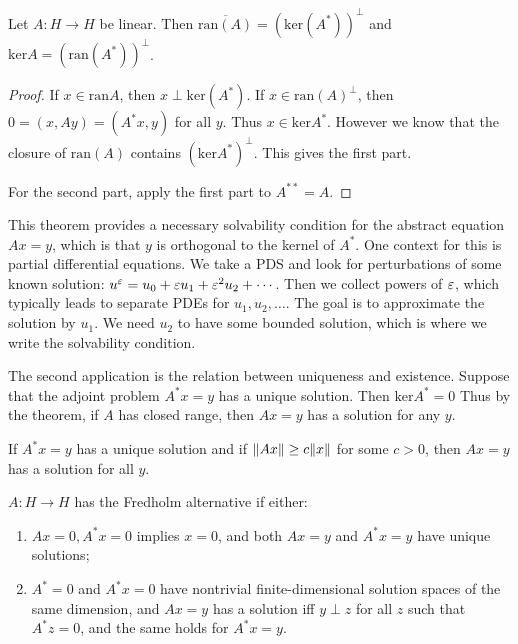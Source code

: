 \documentclass[10pt, twoside]{article}
\begin{document}
    \begin{thm} Let $A: H \to H$ be linear. Then $\overline{\mathrm{ran}(A)} =
        (\mathrm{ker}(A^*))^{\perp}$ and $\mathrm{ker} A =
        (\mathrm{ran}(A^*))^{\perp}$.

        \begin{proof} If $x \in \mathrm{ran} A$, then $x \perp
            \mathrm{ker}(A^*)$. If $x \in \mathrm{ran}(A)^{\perp}$, then $0 =
            (x,Ay) = (A^*x,y)$ for all $y$. Thus $x \in \mathrm{ker}A^*$.
            However we know that the closure of $\mathrm{ran}(A)$ contains
            $(\mathrm{ker} A^*)^{\perp}$. This gives the first part.

            For the second part, apply the first part to $A^{ ** } = A$.
        \end{proof} \end{thm}

    This theorem provides a necessary solvability condition for the abstract
    equation $Ax = y$, which is that $y$ is orthogonal to the kernel of $A^*$.
    One context for this is partial differential equations. We take a PDS and
    look for perturbations of some known solution: $u^{\varepsilon} = u_0 + \varepsilon u_1 +
    \varepsilon^2 u_2 + \cdots$. Then we collect powers of $\varepsilon$, which typically leads
    to separate PDEs for $u_1, u_2, \ldots$. The goal is to approximate the
    solution by $u_1$. We need $u_2$ to have some bounded solution, which is
    where we write the solvability condition.

    The second application is the relation between uniqueness and existence.
    Suppose that the adjoint problem $A^*x = y$ has a unique solution. Then
    $\mathrm{ker}A^* = 0$ Thus by the theorem, if $A$ has closed range, then
    $Ax=y$ has a solution for any $y$.

    \begin{lem} If $A^*x = y$ has a unique solution and if $\lVert Ax\rVert \geq c
    \lVert x\rVert$ for some $c>0$, then $Ax=y$ has a solution for all $y$.
\end{lem}

    \begin{defn} $A:H \to H$ has the Fredholm alternative if either:
        \begin{enumerate} \item $Ax=0,A^*x=0$ implies $x=0$, and both $Ax=y$
            and $A^*x = y$ have unique solutions; \item $A^*=0$ and $A^*x=0$
            have nontrivial finite-dimensional solution spaces of the same
            dimension, and $Ax=y$ has a solution iff $y \perp z$ for all $z$
            such that $A^*z = 0$, and the same holds for $A^*x=y$.
    \end{enumerate} \end{defn}
\end{document}
